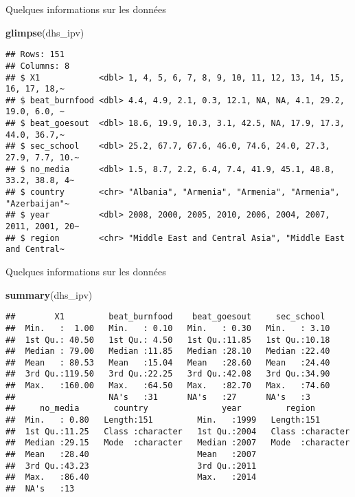 \documentclass[ignorenonframetext,]{beamer}
\newenvironment{Shaded}{\begin{snugshade}}{\end{snugshade}}
\newcommand{\KeywordTok}[1]{\textcolor[rgb]{0.13,0.29,0.53}{\textbf{#1}}}
\newcommand{\NormalTok}[1]{#1}
\begin{document}
\begin{frame}[fragile]{Quelques informations sur les données}

\begin{Shaded}
\begin{Highlighting}[]
\KeywordTok{glimpse}\NormalTok{(dhs_ipv)}
\end{Highlighting}
\end{Shaded}

\begin{verbatim}
## Rows: 151
## Columns: 8
## $ X1            <dbl> 1, 4, 5, 6, 7, 8, 9, 10, 11, 12, 13, 14, 15, 16, 17, 18,~
## $ beat_burnfood <dbl> 4.4, 4.9, 2.1, 0.3, 12.1, NA, NA, 4.1, 29.2, 19.0, 6.0, ~
## $ beat_goesout  <dbl> 18.6, 19.9, 10.3, 3.1, 42.5, NA, 17.9, 17.3, 44.0, 36.7,~
## $ sec_school    <dbl> 25.2, 67.7, 67.6, 46.0, 74.6, 24.0, 27.3, 27.9, 7.7, 10.~
## $ no_media      <dbl> 1.5, 8.7, 2.2, 6.4, 7.4, 41.9, 45.1, 48.8, 33.2, 38.8, 4~
## $ country       <chr> "Albania", "Armenia", "Armenia", "Armenia", "Azerbaijan"~
## $ year          <dbl> 2008, 2000, 2005, 2010, 2006, 2004, 2007, 2011, 2001, 20~
## $ region        <chr> "Middle East and Central Asia", "Middle East and Central~
\end{verbatim}

\end{frame}

\begin{frame}[fragile]{Quelques informations sur les données}

\begin{Shaded}
\begin{Highlighting}[]
\KeywordTok{summary}\NormalTok{(dhs_ipv)}
\end{Highlighting}
\end{Shaded}

\begin{verbatim}
##        X1         beat_burnfood    beat_goesout     sec_school   
##  Min.   :  1.00   Min.   : 0.10   Min.   : 0.30   Min.   : 3.10  
##  1st Qu.: 40.50   1st Qu.: 4.50   1st Qu.:11.85   1st Qu.:10.18  
##  Median : 79.00   Median :11.85   Median :28.10   Median :22.40  
##  Mean   : 80.53   Mean   :15.04   Mean   :28.60   Mean   :24.40  
##  3rd Qu.:119.50   3rd Qu.:22.25   3rd Qu.:42.08   3rd Qu.:34.90  
##  Max.   :160.00   Max.   :64.50   Max.   :82.70   Max.   :74.60  
##                   NA's   :31      NA's   :27      NA's   :3      
##     no_media       country               year         region         
##  Min.   : 0.80   Length:151         Min.   :1999   Length:151        
##  1st Qu.:11.25   Class :character   1st Qu.:2004   Class :character  
##  Median :29.15   Mode  :character   Median :2007   Mode  :character  
##  Mean   :28.40                      Mean   :2007                     
##  3rd Qu.:43.23                      3rd Qu.:2011                     
##  Max.   :86.40                      Max.   :2014                     
##  NA's   :13
\end{verbatim}

\end{frame}
\end{document}
